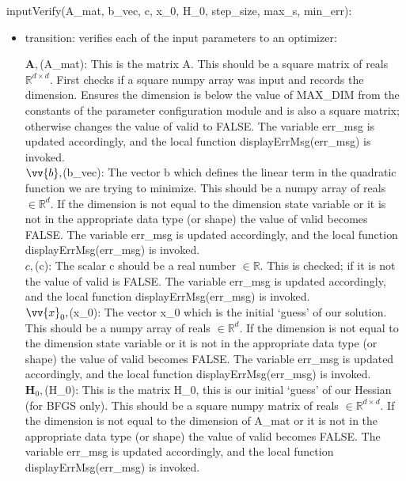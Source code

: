 \documentclass[12pt, titlepage]{article}
\begin{document}
\noindent inputVerify(A\_mat, b\_vec, c, x\_0, H\_0, step\_size, max\_s, min\_err):
\begin{itemize}
\item transition: 
verifies each of the input parameters to an optimizer:

$\mathbf{A},$(A\_mat): This is the matrix A. This should be a square matrix of reals $\mathbb{R}^{d \times d}$. First checks if a square numpy array was input and records the dimension. Ensures the dimension is below the value of MAX\_DIM from the constants of the parameter configuration module and is also a square matrix; otherwise changes the value of valid to FALSE. The variable err\_msg is updated accordingly, and the local function displayErrMsg(err\_msg) is invoked.
\\

\noindent$\vv{b},$(b\_vec): The vector b which defines the linear term in the quadratic function we are trying to minimize. This should be a numpy array of reals $\in \mathbb{R}^d$. If the dimension is not equal to the dimension state variable or it is not in the appropriate data type (or shape) the value of valid becomes FALSE. The variable err\_msg is updated accordingly, and the local function displayErrMsg(err\_msg) is invoked. 
\\

\noindent$c,$(c): The scalar c should be a real number $\in \mathbb{R}$. This is checked; if it is not the value of valid is FALSE. The variable err\_msg is updated accordingly, and the local function displayErrMsg(err\_msg) is invoked.
\\

\noindent $\vv{x}_0,$(x\_0): The vector x\_0 which is the initial `guess' of our solution. This should be a numpy array of reals $\in \mathbb{R}^d$. If the dimension is not equal to the dimension state variable or it is not in the appropriate data type (or shape) the value of valid becomes FALSE. The variable err\_msg is updated accordingly, and the local function displayErrMsg(err\_msg) is invoked.
\\

\noindent $\mathbf{H}_0,$(H\_0): This is the matrix H\_0, this is our initial `guess' of our Hessian (for BFGS only). This should be a square numpy matrix of reals $\in \mathbb{R}^{d \times d}$. If the dimension is not equal to the dimension of A\_mat or it is not in the appropriate data type (or shape) the value of valid becomes FALSE. The variable err\_msg is updated accordingly, and the local function displayErrMsg(err\_msg) is invoked.
\\


\end{itemize}
\end{document}
